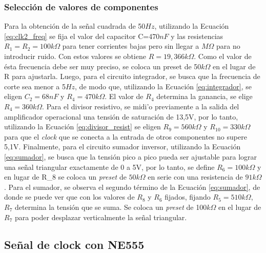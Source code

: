 \documentclass[11pt, a4paper]{article}
\begin{document}
\subsubsection{Selecci\'on de valores de componentes}
\noindent
Para la obtenci\'on de la señal cuadrada de 50$Hz$, utilizando la Ecuaci\'on \ref{eq:clk2_freq} se fija el valor del capacitor C=470$nF$ y las resistencias $R_1=R_2=100k\Omega$ para tener corrientes bajas pero sin llegar a $M\Omega$ para no introducir ruido. Con estos valores se obtiene $R=19,366k\Omega$. Como el valor de \'esta frecuencia debe ser muy preciso, se coloca un preset de 50$k\Omega$ en el lugar de R para ajustarla.\newline
Luego, para el circuito integrador, se busca que la frecuencia de corte sea menor a 5$Hz$, de modo que, utilizando la Ecuaci\'on \ref{eq:integrador}, se eligen $C_2=68nF$ y $R_4 = 470k\Omega$. El valor de $R_4$ determina la ganancia, se elige $R_4=360k\Omega$.
Para el divisor resistivo, se midi'o previamente a la salida del amplificador operacional una tensi\'on de saturaci\'on de 13,5V, por lo tanto, utilizando la Ecuaci\'on \ref{eq:divisor_resist} se eligen $R_9=560k\Omega$ y $R_{10}=330k\Omega$ para que el \textit{clock} que se conecta a la entrada de otros componentes no supere 5,1V.\newline
Finalmente, para el circuito sumador inversor, utilizando la Ecuaci\'on \ref{eq:sumador}, se busca que la tensi\'on pico a pico pueda ser ajustable para lograr una señal triangular exactamente de 0 a 5V, por lo tanto, se define $R_6=100k\Omega$ y en lugar de R_8 se coloca un \textit{preset} de $50k\Omega$ en serie con una resistencia de $91k\Omega$.
Para el sumador, se observa el segundo t\'ermino de la Ecuaci\'on \ref{eq:sumador}, de donde se puede ver que con los valores de $R_8$ y $R_6$ fijados, fijando $R_5=510k\Omega$, $R_7$ determina la tensi\'on que se suma. Se coloca un \textit{preset} de 100$k\Omega$ en el lugar de $R_7$ para poder desplazar verticalmente la señal triangular.
%
\subsection{Señal de clock con NE555}
%
\end{document}

